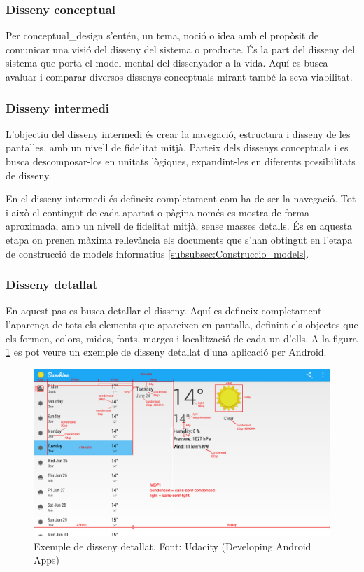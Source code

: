 \subsubsection{Disseny conceptual}
Per \gls{conceptual_design} s'entén, un tema, noció o idea amb el propòsit de comunicar una visió del disseny del sistema o producte. És la part del disseny del sistema que porta el model mental del dissenyador a la vida. 
Aquí es busca avaluar i comparar diversos dissenys conceptuals mirant també la seva viabilitat. 

\subsubsection{Disseny intermedi}
L'objectiu del disseny intermedi és crear la navegació, estructura i disseny de les pantalles, amb un nivell de fidelitat mitjà. Parteix dels dissenys conceptuals i es busca descomposar-los en unitats lògiques, expandint-les en diferents possibilitats de disseny. 

En el disseny intermedi és defineix completament com ha de ser la navegació. Tot i això el contingut de cada apartat o pàgina només es mostra de forma aproximada, amb un nivell de fidelitat mitjà, sense masses detalls. 
És en aquesta etapa on prenen màxima rellevància els documents que s'han obtingut en l'etapa de construcció de models informatius \ref{subsubsec:Construccio_models}.

\subsubsection{Disseny detallat}
En aquest pas es busca detallar el disseny. Aquí es defineix completament l'aparença de tots els elements que apareixen en pantalla, definint els objectes que els formen, colors, mides, fonts, marges i localització de cada un d'ells. A la figura \ref{fig:design_Sunshine} es pot veure un exemple de disseny detallat d'una aplicació per \gls{Android}.

\begin{figure}[ht]
\centering
\includegraphics[scale=0.17]{Sunshine_detailed_design.png}
\caption{Exemple de disseny detallat. Font: Udacity (Developing Android Apps) \cite{developing_android_apps}}
\label{fig:design_Sunshine}
\end{figure}

